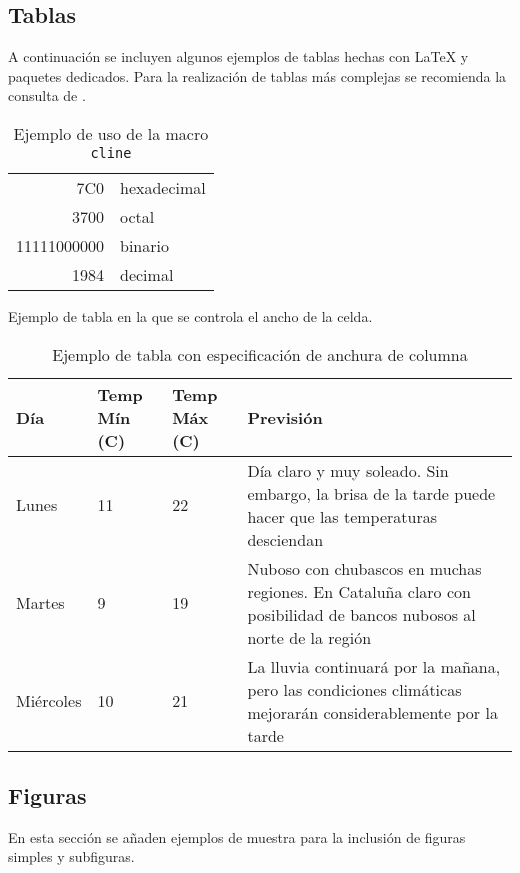 \subsection{Tablas}
\label{sec:tablas}
A continuación se incluyen algunos ejemplos de tablas hechas con 
\LaTeX{} y paquetes dedicados. Para la realización de tablas más complejas se recomienda la consulta de \cite{borbon21,overleaf21}.

\begin{table}[hbt]%
	\centering
	\caption{Ejemplo de uso de la macro \texttt{cline}}
	\label{tab:cline}
	\begin{tabular}[t]{|r|l|}
		\hline
		7C0 & hexadecimal \\[1cm] %
		3700 & octal \\ \cline{2-2}
		11111000000 & binario \\
		\hline \hline
		1984 & decimal \\
		\hline
	\end{tabular}
\end{table}


\noindent Ejemplo de tabla en la que se 
controla el ancho de la celda.

\begin{table}[hbt]%
	\centering
	\caption{Ejemplo de tabla con especificación de anchura de columna}
	\label{tab:anchura}
	\begin{tabular}{ | l | l | l | p{5cm} |}
		\hline
		Día & Temp Mín (\textdegree C) & Temp Máx (\textdegree C) & Previsión \\ \hline
		Lunes & 11 & 22 & Día claro y muy soleado. Sin embargo, la brisa de la tarde puede hacer que las temperaturas desciendan \\ \hline
		Martes & 9 & 19 & Nuboso con chubascos en muchas regiones. En Cataluña claro con posibilidad de bancos nubosos al norte de la región \\ \hline
		Miércoles & 10 & 21 & La lluvia continuará por la mañana, pero las 
		condiciones climáticas mejorarán considerablemente por la tarde\\
		\hline
	\end{tabular}
\end{table}

\clearpage

\subsection{Figuras}
En esta sección se añaden ejemplos de muestra para la inclusión de 
figuras simples y subfiguras.

